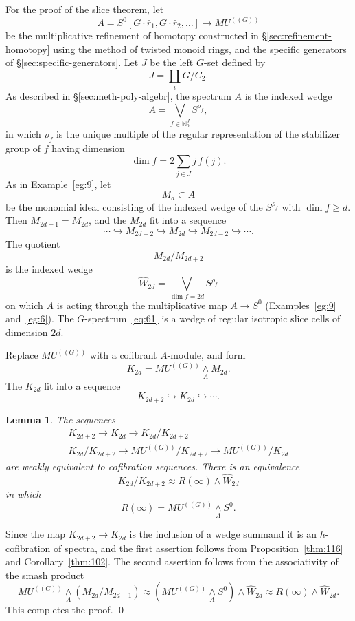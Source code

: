\documentclass{amsart}
\newtheorem{lem}[equation]{Lemma}
\theoremstyle{definition}
\theoremstyle{remark}
\newenvironment{pf}{\bigskip{\em Proof:\/}}{\qed\medskip}
\newcommand{\mutn}[1]{MU^{(\!(#1)\!)}}
\newcommand{\smashove}[1]{\underset{#1}{\wedge}}
\newcommand{\gbar}{\bar}
\newcommand{\rr}{\gbar{r}}
\newcommand{\zt}{C_{2}}
\newcommand{\refine}{\widehat{W}}
\newcommand{\nat}{\mathbb N_{0}}
\begin{document}
For the proof of the slice theorem, let 
\[
A=S^{0}[G\cdot\rr_{1}, G\cdot \rr_{2},\dots] \to \mutn{G} 
\]
be the multiplicative refinement of homotopy constructed in
\S\ref{sec:refinement-homotopy} using the method of
twisted monoid rings, and the specific generators of
\S\ref{sec:specific-generators}.  Let $J$ be the left $G$-set defined
by
\[
J=\coprod_{i} G/\zt.
\]
As described in \S\ref{sec:meth-poly-algebr}, the spectrum $A$ is the indexed
wedge
\[
A=\bigvee_{f\in \nat^{J}} S^{\rho_{f}},
\]
in which $\rho_{f}$ is the unique multiple of the regular
representation of the stabilizer group of $f$ having dimension
\[
\dim f= 2\sum_{j\in J}j\, f(j).
\]
As in Example~\ref{eg:9}, let
\[
M_{d} \subset A
\]
be the monomial ideal consisting of the indexed wedge of the
$S^{\rho_{f}}$ with $\dim f\ge d$.  Then $M_{2d-1}=M_{2d}$, and the
$M_{2d}$ fit into a sequence
\[
\cdots \hookrightarrow M_{2d+2}\hookrightarrow M_{2d}\hookrightarrow
M_{2d-2}\hookrightarrow\cdots.
\]
The quotient 
\[
M_{2d}/M_{2d+2}
\]
is the indexed wedge
\begin{equation}
\label{eq:61}
\refine_{2d} = \bigvee_{\dim f=2d} S^{\rho_{f}}
\end{equation}
on which $A$ is acting through the multiplicative map $A\to S^{0}$
(Examples~\ref{eg:9} and~\ref{eg:6}).  The $G$-spectrum~\eqref{eq:61} is a
wedge of regular isotropic slice cells of dimension $2d$.

Replace $\mutn{G}$ with a cofibrant $A$-module, and form
\[
K_{2d} = \mutn{G}\underset A\wedge M_{2d}.
\]
The $K_{2d}$ fit into a sequence
\[
K_{2d+2}\hookrightarrow K_{2d}\hookrightarrow \cdots.
\]

\begin{lem}
\label{thm:172}  The sequences 
\begin{gather*}
K_{2d+2}\to K_{2d} \to K_{2d}/K_{2d+2} \\
K_{2d}/K_{2d+2}\to \mutn{G}/K_{2d+2}\to \mutn{G}/K_{2d}
\end{gather*}
are weakly equivalent to cofibration sequences.  There is an
equivalence
\begin{equation}\label{eq:31}
K_{2d}/K_{2d+2}\approx R(\infty)\wedge \refine_{2d}
\end{equation}
in which 
\[
R(\infty) = \mutn{G}\underset{A}{\wedge} S^{0}.
\]
\end{lem}

\begin{pf}
Since the map $K_{2d+2}\to K_{2d}$ is the inclusion of a wedge summand
it is an $h$-cofibration of spectra, and the first assertion follows
from Proposition~\ref{thm:116} and Corollary~\ref{thm:102}.  The
second assertion follows from the associativity of the smash product
\[
\mutn{G}\smashove{A} (M_{2d}/M_{2d+1}) \approx
(\mutn{G}\smashove{A}S^{0})\wedge \refine_{2d} \approx R(\infty)\wedge
\refine_{2d}.
\]
This completes the proof.
\end{pf}
\end{document}
